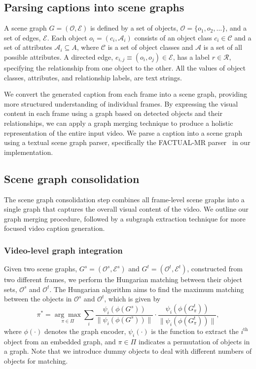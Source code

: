 \subsection{Parsing captions into scene graphs}
A scene graph $G = (\mathcal{O}, \mathcal{E})$ is defined by a set of objects, $\mathcal{O} = \{o_1, o_2, \ldots \}$, and a set of edges, $\mathcal{E}$.
Each object $o_i = (c_i, \mathcal{A}_i)$ consists of an object class $c_i \in \mathcal{C}$ and a set of attributes $\mathcal{A}_i \subseteq A$, where $\mathcal{C}$ is a set of object classes and $\mathcal{A}$ is a set of all possible attributes.
A directed edge, $e_{i,j} \equiv (o_i, o_j) \in \mathcal{E}$, has a label $r \in \mathcal{R}$, specifying the relationship from one object to the other.
All the values of object classes, attributes, and relationship labels, are text strings.

We convert the generated caption from each frame into a scene graph, providing more structured understanding of individual frames. 
By expressing the visual content in each frame using a graph based on detected objects and their relationships, we can apply a graph merging technique to produce a holistic representation of the entire input video.
We parse a caption into a scene graph using a textual scene graph parser, specifically the FACTUAL-MR parser~\cite{li-etal-2023-factual} in our implementation.

\subsection{Scene graph consolidation}
\label{sub:scene}
 
The scene graph consolidation step combines all frame-level scene graphs into a single graph that captures the overall visual content of the video. 
We outline our graph merging procedure, followed by a subgraph extraction technique for more focused video caption generation.

\subsubsection{Video-level graph integration}

Given two scene graphs, $G^s = (\mathcal{O}^s, \mathcal{E}^s)$ and $G^t = (\mathcal{O}^t, \mathcal{E}^t)$, constructed from two different frames, we perform the Hungarian matching between their object sets, $\mathcal{O}^s$ and $\mathcal{O}^t$.
The Hungarian algorithm aims to find the maximum matching between the objects in $\mathcal{O}^s$ and $\mathcal{O}^t$, which is given by
%
\begin{equation}
	\pi^* = \underset{\pi \in \Pi}{\arg\max} \sum_{i} \frac{ \psi_i(\phi(G^s))}{\| \psi_i(\phi(G^s)) \|} \cdot \frac{\psi_i(\phi(G_\pi^t)) }{\| \psi_i(\phi(G_\pi^t)) \|},
\end{equation}
%
where $\phi(\cdot)$ denotes the graph encoder, $\psi_i(\cdot)$ is the function to extract the $i^\text{th}$ object from an embedded graph, and $\pi \in \Pi$ indicates a permutation of objects in a graph.
Note that we introduce dummy objects  to deal with different numbers of objects for matching.

